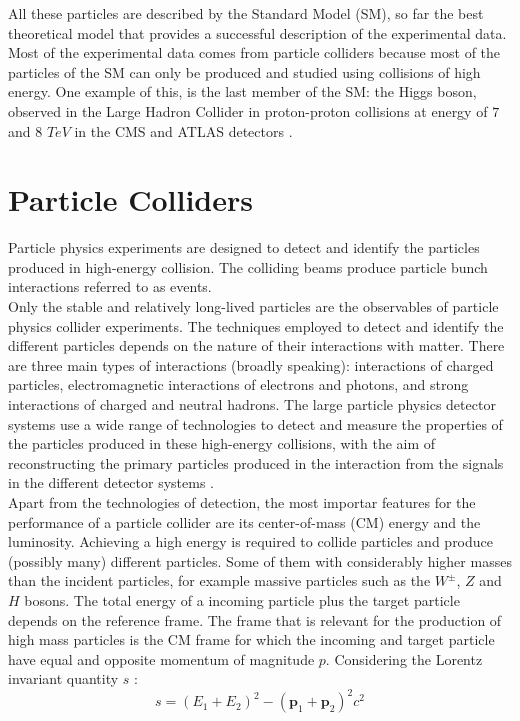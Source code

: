 All these particles are described by the Standard Model (SM), so far the best theoretical model that provides a successful description of the experimental data.
Most of the experimental data comes from particle colliders because most of the particles of the SM can only be produced and studied using collisions of high energy. One example of this, is the last member of the SM: the Higgs boson, observed in the Large Hadron Collider in proton-proton collisions at energy of $7$ and $8$ $TeV$ in the CMS and ATLAS detectors \cite{higgs_CMS,higgs_ATLAS}.





\section{Particle Colliders}

Particle physics experiments are designed to detect and identify the particles produced in high-energy collision. The colliding beams produce particle bunch interactions referred to as events. \\
Only the stable and relatively long-lived particles are the observables of particle physics collider experiments. The techniques employed to detect and identify the different particles depends on the nature of their interactions with matter. There are three main types of interactions (broadly speaking): interactions of charged particles, electromagnetic interactions of electrons and photons, and strong interactions of charged and neutral hadrons. The large particle physics detector systems use a wide range of technologies to detect and measure the properties of the particles produced in these high-energy collisions, with the aim of reconstructing the primary particles produced in the interaction from the signals in the different detector systems \cite{thomson_2013}.\\
Apart from the technologies of detection, the most importar features for the performance of a particle collider are its center-of-mass (CM) energy and the luminosity. Achieving a high energy is required to collide %
particles and produce (possibly many) different particles. Some of them with considerably higher masses than the incident particles, for example massive particles such as the $W^{\pm}$, $Z$ and $H$ bosons. The total energy of a incoming particle plus the target particle depends on the reference frame. The frame that is relevant for the production of high mass particles is the CM frame for which the incoming and target particle have equal and opposite momentum of magnitude $p$. Considering the Lorentz invariant quantity $s$ :
\begin{equation*}
s= (E_{1} +E_{2} )^{2}- (\mathbf{p}_{1}+ \mathbf{p}_{2})^{2}c^{2}
\end{equation*}

